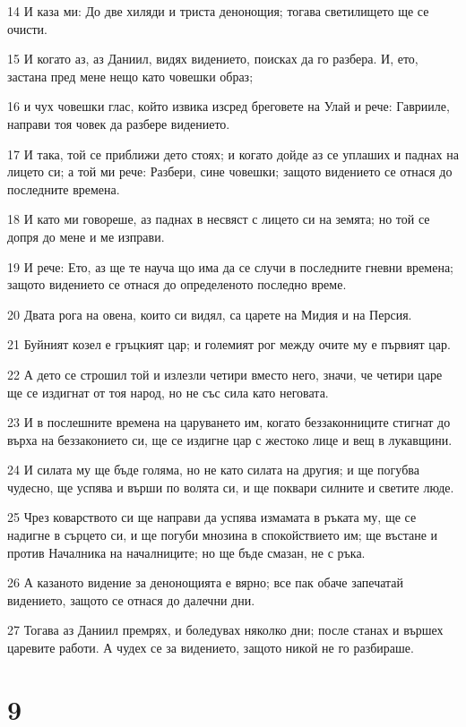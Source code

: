 \par 14 И каза ми: До две хиляди и триста денонощия; тогава светилището ще се очисти.
\par 15 И когато аз, аз Даниил, видях видението, поисках да го разбера. И, ето, застана пред мене нещо като човешки образ;
\par 16 и чух човешки глас, който извика изсред бреговете на Улай и рече: Гаврииле, направи тоя човек да разбере видението.
\par 17 И така, той се приближи дето стоях; и когато дойде аз се уплаших и паднах на лицето си; а той ми рече: Разбери, сине човешки; защото видението се отнася до последните времена.
\par 18 И като ми говореше, аз паднах в несвяст с лицето си на земята; но той се допря до мене и ме изправи.
\par 19 И рече: Ето, аз ще те науча що има да се случи в последните гневни времена; защото видението се отнася до определеното последно време.
\par 20 Двата рога на овена, които си видял, са царете на Мидия и на Персия.
\par 21 Буйният козел е гръцкият цар; и големият рог между очите му е първият цар.
\par 22 А дето се строшил той и излезли четири вместо него, значи, че четири царе ще се издигнат от тоя народ, но не със сила като неговата.
\par 23 И в послешните времена на царуването им, когато беззаконниците стигнат до върха на беззаконието си, ще се издигне цар с жестоко лице и вещ в лукавщини.
\par 24 И силата му ще бъде голяма, но не като силата на другия; и ще погубва чудесно, ще успява и върши по волята си, и ще поквари силните и светите люде.
\par 25 Чрез коварството си ще направи да успява измамата в ръката му, ще се надигне в сърцето си, и ще погуби мнозина в спокойствието им; ще въстане и против Началника на началниците; но ще бъде смазан, не с ръка.
\par 26 А казаното видение за денонощията е вярно; все пак обаче запечатай видението, защото се отнася до далечни дни.
\par 27 Тогава аз Даниил премрях, и боледувах няколко дни; после станах и вършех царевите работи. А чудех се за видението, защото никой не го разбираше.

\chapter{9}

